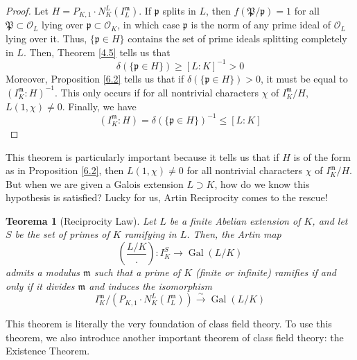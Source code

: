 \documentclass{article}
\DeclareMathOperator{\Gal}{Gal}
\theoremstyle{plain}
\newtheorem{thm}{Teorema}
\newtheorem{cor}[thm]{Corolário}
\theoremstyle{definition}
\theoremstyle{remark}
\numberwithin{equation}{section}
\numberwithin{thm}{section}
\begin{document}
\begin{proof}
Let $H = P_{K, 1} \cdot N_{K}^{L}(I_{L}^{\mathfrak{m}})$. If $\mathfrak{p}$ splits in $L$, then $f(\mathfrak{P} / \mathfrak{p}) = 1$ for all $\mathfrak{P} \subset \mathcal{O}_L$ lying over $\mathfrak{p} \subset \mathcal{O}_K$, in which case $\mathfrak{p}$ is the norm of any prime ideal of $\mathcal{O}_L$ lying over it. Thus, $\{\mathfrak{p} \in H\}$ contains the set of prime ideals splitting completely in $L$. Then, Theorem \ref{4.5} tells us that $$\delta(\{\mathfrak{p} \in H\}) \geq [L : K]^{-1} > 0$$ Moreover, Proposition \ref{6.2} tells us that if $\delta(\{\mathfrak{p} \in H\}) > 0$, it must be equal to $(I_{K}^{\mathfrak{m}} : H)^{-1}$. This only occurs if for all nontrivial characters $\chi$ of $I_{K}^{\mathfrak{m}}/H$, $L(1, \chi) \neq 0$. Finally, we have $$(I_{K}^{\mathfrak{m}} : H) = \delta(\{\mathfrak{p} \in H\})^{-1} \leq [L : K]$$ 
\end{proof}


This theorem is particularly important because it tells us that if $H$ is of the form as in Proposition \ref{6.2}, then $L(1, \chi) \neq 0$ for all nontrivial characters $\chi$ of $I_{K}^{\mathfrak{m}}/H$. But when we are given a Galois extension $L \supset K$, how do we know this hypothesis is satisfied? Lucky for us, Artin Reciprocity comes to the rescue!

\begin{thm}[Reciprocity Law] \label{6.4}
Let $L$ be a finite Abelian extension of $K$, and let $S$ be the set of primes of $K$ ramifying in $L$. Then, the Artin map $$\left(\frac{L/K}{.}\right) : I_{K}^{S} \longrightarrow \Gal(L/K)$$ admits a modulus $\mathfrak{m}$ such that a prime of $K$ (finite or infinite) ramifies if and only if it divides $\mathfrak{m}$ and induces the isomorphism $$I_{K}^{\mathfrak{m}}/(P_{K,1}\cdot N_{K}^{L}(I_{L}^{\mathfrak{m}})) \xrightarrow{\sim} \Gal(L/K)$$
\end{thm}

This theorem is literally the very foundation of class field theory. To use this theorem, we also introduce another important theorem of class field theory: the Existence Theorem.
\end{document}
